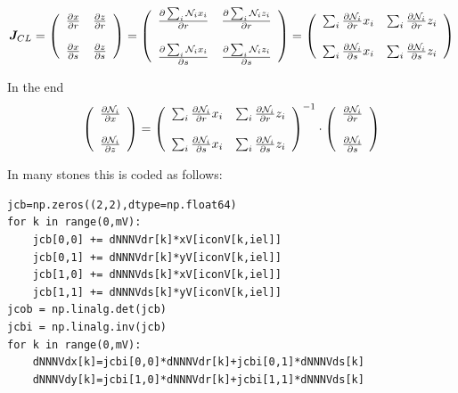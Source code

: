\[
{\bm J}_{CL}
=
\left(
\begin{array}{cc}
\frac{\partial x}{\partial r}  & 
\frac{\partial z}{\partial r}   \\ \\
\frac{\partial x}{\partial s}  & 
\frac{\partial z}{\partial s}  
\end{array}
\right)
=
\left(
\begin{array}{cc}
\frac{\partial \sum_i {\mathcal{N}}_i x_i}{\partial r}  & 
\frac{\partial \sum_i {\mathcal{N}}_i z_i}{\partial r}   \\ \\
\frac{\partial \sum_i {\mathcal{N}}_i x_i}{\partial s}  & 
\frac{\partial \sum_i {\mathcal{N}}_i z_i}{\partial s}  
\end{array}
\right)
=
\left(
\begin{array}{cc}
\sum_i\frac{\partial {\mathcal{N}}_i}{\partial r}x_i  & 
\sum_i\frac{\partial {\mathcal{N}}_i}{\partial r}z_i   \\ \\
\sum_i\frac{\partial {\mathcal{N}}_i}{\partial s}x_i  & 
\sum_i\frac{\partial {\mathcal{N}}_i}{\partial s}z_i  
\end{array}
\right)
\]

In the end
\begin{equation}
\left(
\begin{array}{c}
\frac{\partial {\mathcal{N}}_i}{\partial x} \\ \\
\frac{\partial {\mathcal{N}}_i}{\partial z} 
\end{array}
\right)
=
\left(
\begin{array}{cc}
\sum_i\frac{\partial {\mathcal{N}}_i}{\partial r}x_i  & 
\sum_i\frac{\partial {\mathcal{N}}_i}{\partial r}z_i   \\ \\
\sum_i\frac{\partial {\mathcal{N}}_i}{\partial s}x_i  & 
\sum_i\frac{\partial {\mathcal{N}}_i}{\partial s}z_i  
\end{array}
\right)^{-1}
\cdot
\left(
\begin{array}{c}
\frac{\partial {\mathcal{N}}_i}{\partial r} \\ \\
\frac{\partial {\mathcal{N}}_i}{\partial s} 
\end{array}
\right)
\label{eq:mappDJ1}
\end{equation}

In many stones this is coded as follows:
\begin{lstlisting}
jcb=np.zeros((2,2),dtype=np.float64)
for k in range(0,mV):
    jcb[0,0] += dNNNVdr[k]*xV[iconV[k,iel]]
    jcb[0,1] += dNNNVdr[k]*yV[iconV[k,iel]]
    jcb[1,0] += dNNNVds[k]*xV[iconV[k,iel]]
    jcb[1,1] += dNNNVds[k]*yV[iconV[k,iel]]
jcob = np.linalg.det(jcb)
jcbi = np.linalg.inv(jcb)
for k in range(0,mV):
    dNNNVdx[k]=jcbi[0,0]*dNNNVdr[k]+jcbi[0,1]*dNNNVds[k]
    dNNNVdy[k]=jcbi[1,0]*dNNNVdr[k]+jcbi[1,1]*dNNNVds[k]
\end{lstlisting}


